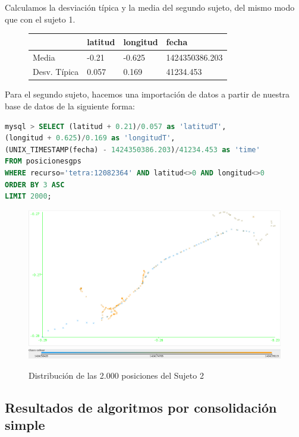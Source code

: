 \documentclass[a4paper, 12pt]{article}
\begin{document}
Calculamos la desviaci\'on t\'ipica y la media del segundo sujeto, del mismo modo que con el sujeto 1.

\begin{figure}[H]
	\begin{tabular}{| l | l | l | l |}
	\hline
	\rowcolor{LightCyan}
	\hline
  		& latitud & longitud & fecha \\
	\hline
	\hline
		Media & -0.21 &  -0.625 & 1424350386.203 \\
		Desv. T\'ipica & 0.057 & 0.169 & 41234.453 \\
	\hline
	\end{tabular}
\end{figure}

Para el segundo sujeto, hacemos una importaci\'on de datos a partir de nuestra base de datos de la siguiente forma:\\

\begin{lstlisting}[language=sql, columns=fullflexible, basicstyle=\small, frame=tblr]
mysql > SELECT (latitud + 0.21)/0.057 as 'latitudT', 
(longitud + 0.625)/0.169 as 'longitudT', 
(UNIX_TIMESTAMP(fecha) - 1424350386.203)/41234.453 as 'time'
FROM posicionesgps
WHERE recurso='tetra:12082364' AND latitud<>0 AND longitud<>0
ORDER BY 3 ASC
LIMIT 2000;
\end{lstlisting}

\begin{figure}[H]
	\includegraphics[scale=.5]{../comparativa/sujeto2.png}
	\includegraphics[scale=.4]{../comparativa/leyenda.png}
	\caption{Distribuci\'on de las 2.000 posiciones del Sujeto 2}
\end{figure}

\subsection{Resultados de algoritmos por consolidaci\'on simple}
\end{document}
